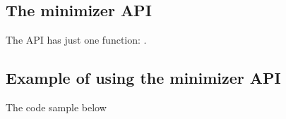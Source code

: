 


\subsection{The minimizer API}

The  API has just one function:
.

\subsection{Example of using the minimizer API}

The code sample below 

